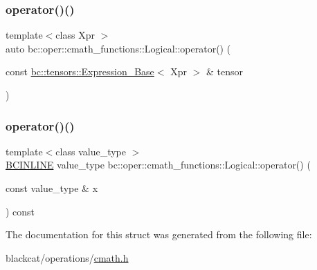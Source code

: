 \mbox{\label{structbc_1_1oper_1_1cmath__functions_1_1Logical_afb666a2d7b3a78aca88015d8c4411729}} 
\subsubsection{\texorpdfstring{operator()()}{operator()()}\hspace{0.1cm}{\footnotesize\ttfamily [2/3]}}
{\footnotesize\ttfamily template$<$class Xpr $>$ \\
auto bc\+::oper\+::cmath\+\_\+functions\+::\+Logical\+::operator() (\begin{DoxyParamCaption}\item[{const \hyperlink{classbc_1_1tensors_1_1Expression__Base}{bc\+::tensors\+::\+Expression\+\_\+\+Base}$<$ Xpr $>$ \&}]{tensor }\end{DoxyParamCaption})\hspace{0.3cm}{\ttfamily [inline]}}

\mbox{\label{structbc_1_1oper_1_1cmath__functions_1_1Logical_ab854d797bd109844cc9ba7d3ce1cfcee}} 
\subsubsection{\texorpdfstring{operator()()}{operator()()}\hspace{0.1cm}{\footnotesize\ttfamily [3/3]}}
{\footnotesize\ttfamily template$<$class value\+\_\+type $>$ \\
\hyperlink{common_8h_a6699e8b0449da5c0fafb878e59c1d4b1}{B\+C\+I\+N\+L\+I\+NE} value\+\_\+type bc\+::oper\+::cmath\+\_\+functions\+::\+Logical\+::operator() (\begin{DoxyParamCaption}\item[{const value\+\_\+type \&}]{x }\end{DoxyParamCaption}) const\hspace{0.3cm}{\ttfamily [inline]}}



The documentation for this struct was generated from the following file\+:\begin{DoxyCompactItemize}
\item 
blackcat/operations/\hyperlink{cmath_8h}{cmath.\+h}\end{DoxyCompactItemize}
